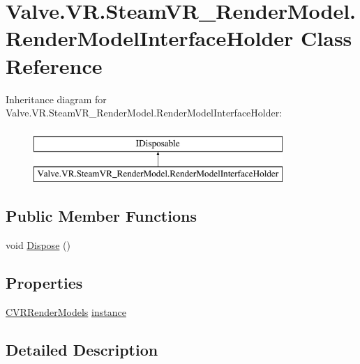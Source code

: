 \hypertarget{class_valve_1_1_v_r_1_1_steam_v_r___render_model_1_1_render_model_interface_holder}{}\section{Valve.\+V\+R.\+Steam\+V\+R\+\_\+\+Render\+Model.\+Render\+Model\+Interface\+Holder Class Reference}
\label{class_valve_1_1_v_r_1_1_steam_v_r___render_model_1_1_render_model_interface_holder}
Inheritance diagram for Valve.\+V\+R.\+Steam\+V\+R\+\_\+\+Render\+Model.\+Render\+Model\+Interface\+Holder\+:\begin{figure}[H]
\begin{center}
\leavevmode
\includegraphics[height=2.000000cm]{class_valve_1_1_v_r_1_1_steam_v_r___render_model_1_1_render_model_interface_holder}
\end{center}
\end{figure}
\subsection*{Public Member Functions}
\begin{DoxyCompactItemize}
\item 
void \mbox{\hyperlink{class_valve_1_1_v_r_1_1_steam_v_r___render_model_1_1_render_model_interface_holder_a083e37229825793a4e479c58f2f4dc47}{Dispose}} ()
\end{DoxyCompactItemize}
\subsection*{Properties}
\begin{DoxyCompactItemize}
\item 
\mbox{\hyperlink{class_valve_1_1_v_r_1_1_c_v_r_render_models}{C\+V\+R\+Render\+Models}} \mbox{\hyperlink{class_valve_1_1_v_r_1_1_steam_v_r___render_model_1_1_render_model_interface_holder_a7c72010e9399bb1d83d1cf8105fe49c8}{instance}}
\end{DoxyCompactItemize}


\subsection{Detailed Description}


